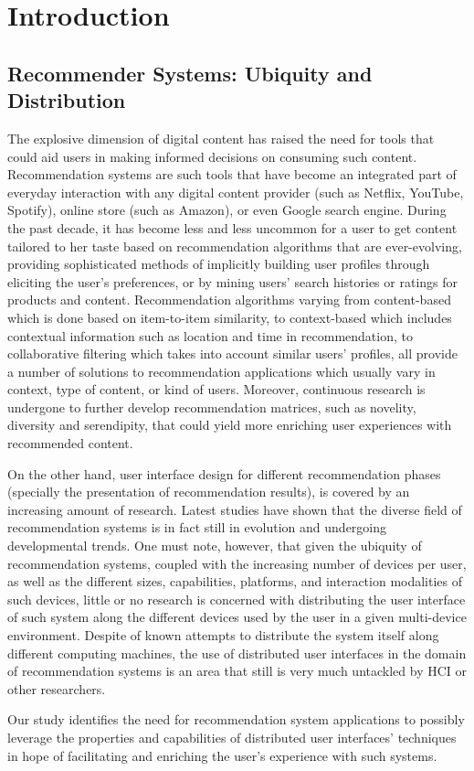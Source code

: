 \chapter{Introduction}\label{chapter:introduction}

\section{Recommender Systems: Ubiquity and Distribution}
The explosive dimension of digital content has raised the need for tools that
could aid users in making informed decisions on consuming such content.
Recommendation systems are such tools that have become an integrated part of
everyday interaction with any digital content provider (such as Netflix,
YouTube, Spotify), online store (such as Amazon), or even Google search engine. During
the past decade, it has become less and less uncommon for a user to get content
tailored to her taste based on recommendation algorithms \cite{kantor2011recommender} that are
ever-evolving, providing sophisticated methods of implicitly building user profiles
through eliciting the user's preferences, or by mining users' search histories
or ratings for products and content. Recommendation algorithms varying from
content-based which is done based on item-to-item similarity, to context-based
which includes contextual information such as location and time in
recommendation, to collaborative filtering which takes into account similar
users' profiles, all provide a number of solutions to recommendation
applications which usually vary in context, type of content, or kind of users.
Moreover, continuous research is undergone to further develop recommendation
matrices, such as novelity, diversity and serendipity, that could yield more enriching user experiences with recommended content.
\par On the other hand, user interface design for different recommendation
phases (specially the presentation of recommendation results), is covered by an
increasing amount of research. Latest studies \cite{kim2015scientometric} have
shown that the diverse field of recommendation systems is in fact still in
evolution and undergoing developmental trends. One must note, however, that
given the ubiquity of recommendation systems, coupled with the increasing number of devices per user, as well as the different sizes, capabilities, platforms, and interaction modalities of such devices, little or no research is concerned with distributing the user interface of such system along the different devices used by the user in a given multi-device
environment. Despite of known attempts to distribute the system itself along
different computing machines, the use of distributed user interfaces in the
domain of recommendation systems is an area that still is very much untackled
by HCI or other researchers.\par
Our study identifies the need for recommendation system applications to possibly
leverage the properties and capabilities of distributed user interfaces'
techniques in hope of facilitating and enriching the user's experience with such systems.

